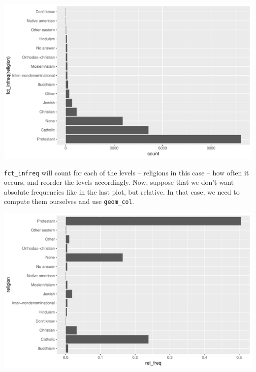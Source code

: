 \documentclass[]{tufte-book}
\newenvironment{Shaded}{}{}
\newcommand{\KeywordTok}[1]{\textcolor[rgb]{0.00,0.44,0.13}{\textbf{#1}}}
\newcommand{\DataTypeTok}[1]{\textcolor[rgb]{0.56,0.13,0.00}{#1}}
\newcommand{\StringTok}[1]{\textcolor[rgb]{0.25,0.44,0.63}{#1}}
\newcommand{\OperatorTok}[1]{\textcolor[rgb]{0.40,0.40,0.40}{#1}}
\newcommand{\NormalTok}[1]{#1}
\begin{document}
\includegraphics{cleaning_tutorial_files/figure-latex/unnamed-chunk-81-1}

\texttt{fct\_infreq} will count for each of the levels -- religions in
this case -- how often it occurs, and reorder the levels accordingly.
Now, suppose that we don't want absolute frequencies like in the last
plot, but relative. In that case, we need to compute them ourselves and
use \texttt{geom\_col}.

\begin{Shaded}
\end{Shaded}

\includegraphics{cleaning_tutorial_files/figure-latex/unnamed-chunk-82-1}
\end{document}
